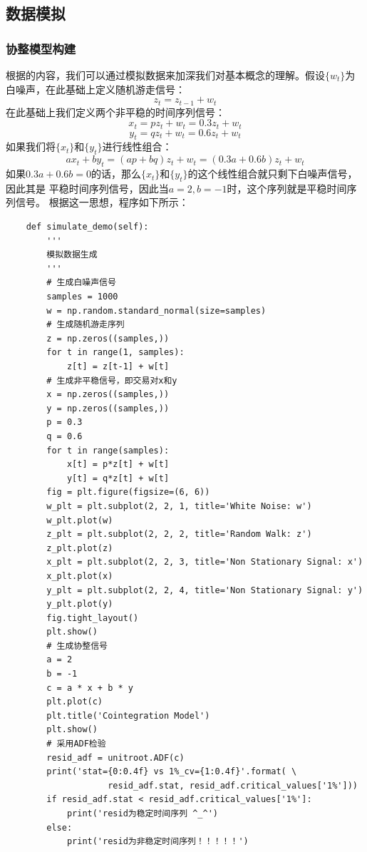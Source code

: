 \documentclass{article}
\begin{document}
\subsection{数据模拟}
\subsubsection{协整模型构建}
根据\cite{r000002}的内容，我们可以通过模拟数据来加深我们对基本概念的理解。假设$\{ w_{t} \}$为白噪声，在此基础上定义随机游走信号：
\begin{equation}
z_{t} = z_{t-1} + w_{t}
\label{e000058}
\end{equation}
在此基础上我们定义两个非平稳的时间序列信号：
\begin{equation}
x_{t} = pz_{t} + w_{t} = 0.3z_{t} + w_{t}
\label{e000059}
\end{equation}
\begin{equation}
y_{t} = qz_{t} + w_{t} = 0.6z_{t} + w_{t}
\label{e000060}
\end{equation}
如果我们将$\{ x_{t} \}$和$\{ y_{t} \}$进行线性组合：
\begin{equation}
ax_{t} + by_{t} = (ap+bq)z_{t} + w_{t} = (0.3a+0.6b)z_{t} + w_{t}
\label{e000061}
\end{equation}
如果$0.3a+0.6b=0$的话，那么$\{ x_{t} \}$和$\{ y_{t} \}$的这个线性组合就只剩下白噪声信号，因此其是
平稳时间序列信号，因此当$a=2, b=-1$时，这个序列就是平稳时间序列信号。\newline
根据这一思想，程序如下所示：
\begin{lstlisting}
    def simulate_demo(self):
        '''
        模拟数据生成
        '''
        # 生成白噪声信号
        samples = 1000
        w = np.random.standard_normal(size=samples)
        # 生成随机游走序列
        z = np.zeros((samples,))
        for t in range(1, samples):
            z[t] = z[t-1] + w[t]
        # 生成非平稳信号，即交易对x和y
        x = np.zeros((samples,))
        y = np.zeros((samples,))
        p = 0.3
        q = 0.6
        for t in range(samples):
            x[t] = p*z[t] + w[t]
            y[t] = q*z[t] + w[t]
        fig = plt.figure(figsize=(6, 6))
        w_plt = plt.subplot(2, 2, 1, title='White Noise: w')
        w_plt.plot(w)
        z_plt = plt.subplot(2, 2, 2, title='Random Walk: z')
        z_plt.plot(z)
        x_plt = plt.subplot(2, 2, 3, title='Non Stationary Signal: x')
        x_plt.plot(x)
        y_plt = plt.subplot(2, 2, 4, title='Non Stationary Signal: y')
        y_plt.plot(y)
        fig.tight_layout()
        plt.show()
        # 生成协整信号
        a = 2
        b = -1
        c = a * x + b * y
        plt.plot(c)
        plt.title('Cointegration Model')
        plt.show()
        # 采用ADF检验 
        resid_adf = unitroot.ADF(c)
        print('stat={0:0.4f} vs 1%_cv={1:0.4f}'.format( \
                    resid_adf.stat, resid_adf.critical_values['1%']))
        if resid_adf.stat < resid_adf.critical_values['1%']:
            print('resid为稳定时间序列 ^_^')
        else:
            print('resid为非稳定时间序列！！！！！')
\end{lstlisting}
\end{document}
